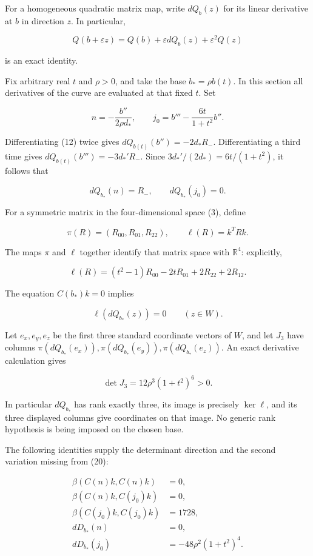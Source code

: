\documentclass[11pt]{article}
\begin{document}
For a homogeneous quadratic matrix map, write \(dQ_b(z)\) for its linear
derivative at \(b\) in direction \(z\). In particular,

\[
Q(b+\varepsilon z)
 =Q(b)+\varepsilon dQ_b(z)+\varepsilon^2Q(z)
\tag{15}
\]

is an exact identity.

Fix arbitrary real \(t\) and \(\rho>0\), and take the base
\(b_*=\rho b(t)\). In this section all derivatives of the curve are
evaluated at that fixed \(t\). Set

\[
n=-\frac{b''}{2\rho d_*},\qquad
j_0=b'''-\frac{6t}{1+t^2}b''.
\tag{16}
\]

Differentiating (12) twice gives
\(dQ_{b(t)}(b'')=-2d_*R_-\). Differentiating a third time gives
\(dQ_{b(t)}(b''')=-3d_*'R_-\). Since
\(3d_*'/(2d_*)=6t/(1+t^2)\), it follows that

\[
dQ_{b_*}(n)=R_-,\qquad dQ_{b_*}(j_0)=0.
\tag{17}
\]

For a symmetric matrix in the four-dimensional space (3), define

\[
\pi(R)=(R_{00},R_{01},R_{22}),\qquad
\ell(R)=k^TRk.
\tag{18}
\]

The maps \(\pi\) and \(\ell\) together identify that matrix space with
\(\mathbb R^4\): explicitly,

\[
\ell(R)=(t^2-1)R_{00}-2tR_{01}+2R_{22}+2R_{12}.
\tag{19}
\]

The equation \(C(b_*)k=0\) implies

\[
\ell(dQ_{b_*}(z))=0\qquad(z\in W).
\tag{20}
\]

Let \(e_x,e_y,e_z\) be the first three standard coordinate vectors of
\(W\), and let \(J_3\) have columns
\(\pi(dQ_{b_*}(e_x)),\pi(dQ_{b_*}(e_y)),\pi(dQ_{b_*}(e_z))\).
An exact derivative calculation gives

\[
\det J_3=12\rho^3(1+t^2)^6>0.
\tag{21}
\]

In particular \(dQ_{b_*}\) has rank exactly three, its image is precisely
\(\ker\ell\), and its three displayed columns give coordinates on that
image. No generic rank hypothesis is being imposed on the chosen base.

The following identities supply the determinant direction and the second
variation missing from (20):

\[
\begin{aligned}
\beta(C(n)k,C(n)k)&=0,\\
\beta(C(n)k,C(j_0)k)&=0,\\
\beta(C(j_0)k,C(j_0)k)&=1728,\\
dD_{b_*}(n)&=0,\\
dD_{b_*}(j_0)&=-48\rho^2(1+t^2)^4.
\end{aligned}
\tag{22}
\]
\end{document}
